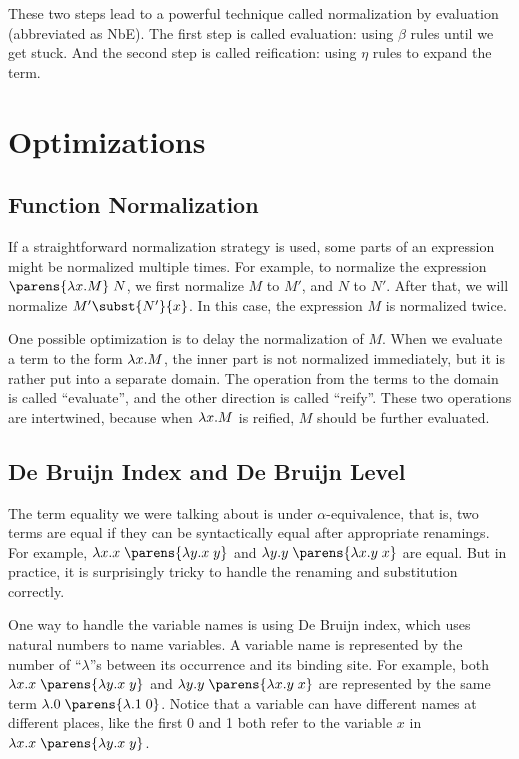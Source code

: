 \documentclass[11pt]{article}
\begin{document}
These two steps lead to a powerful technique called normalization by evaluation (abbreviated as NbE). The first step is called evaluation: using $\beta$ rules until we get stuck. And the second step is called reification: using $\eta$ rules to expand the term.

\section{Optimizations}

\subsection{Function Normalization}
If a straightforward normalization strategy is used, some parts of an expression might be normalized multiple times. For example, to normalize the expression $\app{\parens{\lam{x}{M}}}{N}$, we first normalize $M$ to $M'$, and $N$ to $N'$. After that, we will normalize $M'\subst{N'}{x}$. In this case, the expression $M$ is normalized twice.

One possible optimization is to delay the normalization of $M$. When we evaluate a term to the form $\lam{x}{M}$, the inner part is not normalized immediately, but it is rather put into a separate domain. The operation from the terms to the domain is called ``evaluate'', and the other direction is called ``reify''. These two operations are intertwined, because when $\lam{x}{M}$ is reified, $M$ should be further evaluated.

\subsection{De Bruijn Index and De Bruijn Level}
The term equality we were talking about is under $\alpha$-equivalence, that is, two terms are equal if they can be syntactically equal after appropriate renamings. For example, $\lam{x}{\app{x}{\parens{\lam{y}{\app{x}{y}}}}}$ and $\lam{y}{\app{y}{\parens{\lam{x}{\app{y}{x}}}}}$ are equal. But in practice, it is surprisingly tricky to handle the renaming and substitution correctly.

One way to handle the variable names is using De Bruijn index, which uses natural numbers to name variables. A variable name is represented by the number of ``$\lambda$''s between its occurrence and its binding site. For example, both $\lam{x}{\app{x}{\parens{\lam{y}{\app{x}{y}}}}}$ and $\lam{y}{\app{y}{\parens{\lam{x}{\app{y}{x}}}}}$ are represented by the same term $\lam{}{\app{0}{\parens{\lam{}{\app{1}{0}}}}}$. Notice that a variable can have different names at different places, like the first 0 and 1 both refer to the variable $x$ in
$\lam{x}{\app{x}{\parens{\lam{y}{\app{x}{y}}}}}$.
\end{document}
